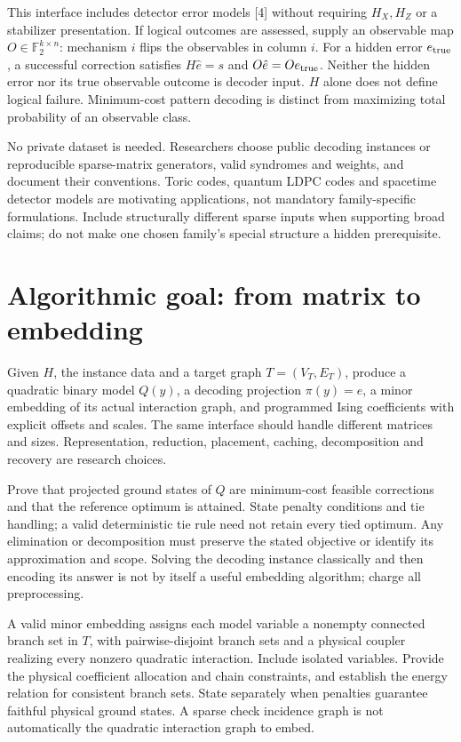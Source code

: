 \documentclass[11pt,letterpaper]{article}
\begin{document}
This interface includes detector error models [4] without requiring $H_X,H_Z$ or a stabilizer presentation. If logical outcomes are assessed, supply an observable map $O\in\mathbb F_2^{k\times n}$: mechanism $i$ flips the observables in column $i$. For a hidden error $e_{\rm true}$, a successful correction satisfies $H\hat e=s$ and $O\hat e=Oe_{\rm true}$. Neither the hidden error nor its true observable outcome is decoder input. $H$ alone does not define logical failure. Minimum-cost pattern decoding is distinct from maximizing total probability of an observable class.\par

No private dataset is needed. Researchers choose public decoding instances or reproducible sparse-matrix generators, valid syndromes and weights, and document their conventions. Toric codes, quantum LDPC codes and spacetime detector models are motivating applications, not mandatory family-specific formulations. Include structurally different sparse inputs when supporting broad claims; do not make one chosen family's special structure a hidden prerequisite.\par

\section{Algorithmic goal: from matrix to embedding}

Given $H$, the instance data and a target graph $T=(V_T,E_T)$, produce a quadratic binary model $Q(y)$, a decoding projection $\pi(y)=e$, a minor embedding of its actual interaction graph, and programmed Ising coefficients with explicit offsets and scales. The same interface should handle different matrices and sizes. Representation, reduction, placement, caching, decomposition and recovery are research choices.\par

Prove that projected ground states of $Q$ are minimum-cost feasible corrections and that the reference optimum is attained. State penalty conditions and tie handling; a valid deterministic tie rule need not retain every tied optimum. Any elimination or decomposition must preserve the stated objective or identify its approximation and scope. Solving the decoding instance classically and then encoding its answer is not by itself a useful embedding algorithm; charge all preprocessing.\par

A valid minor embedding assigns each model variable a nonempty connected branch set in $T$, with pairwise-disjoint branch sets and a physical coupler realizing every nonzero quadratic interaction. Include isolated variables. Provide the physical coefficient allocation and chain constraints, and establish the energy relation for consistent branch sets. State separately when penalties guarantee faithful physical ground states. A sparse check incidence graph is not automatically the quadratic interaction graph to embed.\par
\end{document}

